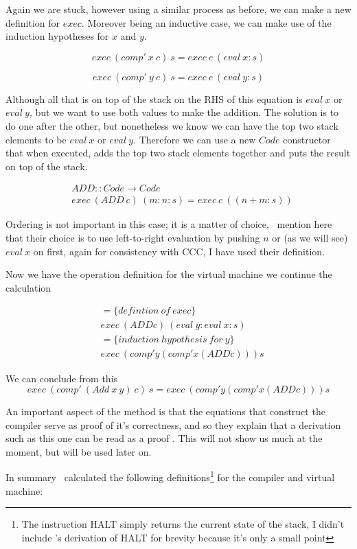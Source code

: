 \documentclass {article}
\begin{document}
Again we are stuck, however using a similar process
as before, we can make a new definition for $exec$.
Moreover being an inductive case, 
we can make use of the induction 
hypotheses for $x$ and $y$\cite{bandh}.

\[exec\ (comp'\ x\ c)\ s = exec\ c\ (eval\ x:s) \]

\[exec\ (comp'\ y\ c)\ s = exec\ c\ (eval\ y:s) \]

Although all that is on top of the stack on the
RHS of this equation is $eval\ x$ or $eval\ y$,
but we want to use both values to make the addition.
The solution is to do one after the other,
but nonetheless we know we can have the top two 
stack elements to be $eval\ x$ or $eval\ y$.
Therefore we can use a new $Code$ constructor
that when executed, adds the top two stack elements
together and puts the result on top of the stack.

\begin{align*}
	&ADD :: Code \rightarrow Code \\
	&exec\ (ADD\ c)\ (m:n:s) = exec\ c\ ((n+m:s))
\end{align*}

Ordering is not important in this case; it is a matter of choice,
\BH\ mention here that their choice is to use
left-to-right evaluation by pushing $n$ 
or (as we will see)  $eval\ x$ on first,
again for consistency with CCC, 
I have used their definition.

Now we have the operation definition for the 
virtual machine we continue the calculation 

\begin{align*}
	&= \{ defintion\ of\ exec \} \\
	&exec\ (ADD c)\ (eval\ y : eval\ x : s) \\
	&= \{ induction\ hypothesis\ for\ y \} \\
	&exec\ (comp' y (comp' x (ADD c))) s
\end{align*}

We can conclude from this 
\[ exec\ (comp'\ (Add\ x\ y)\ c)\ s = exec\ (comp' y (comp' x (ADD c))) s \]

An important aspect of the \BH method
is that the equations that construct the 
compiler serve as proof of it's correctness,
and so they explain that a derivation such as
this one can be read as a proof \cite[page 14]{bandh}.
This will not show us much at the moment,
but will be used later on.

In summary \BH\ calculated the following definitions\footnote{
The instruction HALT simply returns the current state of the stack,
I didn't include \BH's derivation of HALT for brevity because
it's only a small point}
for the compiler and virtual machine:
\end{document}

